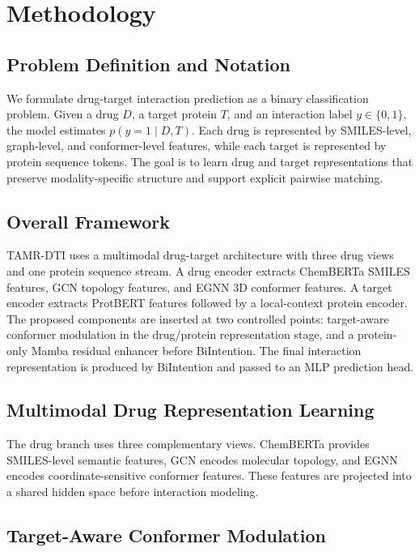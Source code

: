 \section{Methodology}
\label{sec:methodology}

\subsection{Problem Definition and Notation}

We formulate drug-target interaction prediction as a binary classification problem. Given a drug $D$, a target protein $T$, and an interaction label $y\in\{0,1\}$, the model estimates $p(y=1\mid D,T)$. Each drug is represented by SMILES-level, graph-level, and conformer-level features, while each target is represented by protein sequence tokens. The goal is to learn drug and target representations that preserve modality-specific structure and support explicit pairwise matching.

\subsection{Overall Framework}

TAMR-DTI uses a multimodal drug-target architecture with three drug views and one protein sequence stream. A drug encoder extracts ChemBERTa SMILES features, GCN topology features, and EGNN 3D conformer features. A target encoder extracts ProtBERT features followed by a local-context protein encoder. The proposed components are inserted at two controlled points: target-aware conformer modulation in the drug/protein representation stage, and a protein-only Mamba residual enhancer before BiIntention. The final interaction representation is produced by BiIntention and passed to an MLP prediction head.

\subsection{Multimodal Drug Representation Learning}

The drug branch uses three complementary views. ChemBERTa provides SMILES-level semantic features, GCN encodes molecular topology, and EGNN encodes coordinate-sensitive conformer features. These features are projected into a shared hidden space before interaction modeling.

\subsection{Target-Aware Conformer Modulation}

